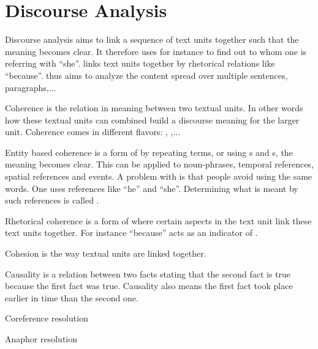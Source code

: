 \section{Discourse Analysis}
\begin{df}{Discourse analysis}
\sb{} aims to link a sequence of text units together such that the meaning becomes clear. It therefore uses for instance  to find out to whom one is referring with ``she''.  links text units together by rhetorical relations like ``because''. \sb{} thus aims to analyze the content spread over multiple sentences, paragraphs,...
\end{df}
\begin{df}{Coherence}
\sb{} is the relation in meaning between two textual units. In other words how these textual units can combined build a discourse meaning for the larger unit. Coherence comes in different flavors: , ,...
\end{df}
\begin{df}{Entity based coherence}
\sb{} is a form of  by repeating terms, or using s and s, the meaning becomes clear. This can be applied to noun-phrases, temporal references, spatial references and events. A problem with \sb{} is that people avoid using the same words. One uses references like ``he'' and ``she''. Determining what is meant by such references is called .
\end{df}
\begin{df}{Rhetorical coherence}
\sb{} is a form of  where certain aspects in the text unit link these text units together. For instance ``because'' acts as an indicator of .
\end{df}
\begin{df}{Cohesion}
\sb{} is the way textual units are linked together.
\end{df}
\begin{df}{Causality}
\sb{} is a relation between two facts stating that the second fact is true because the first fact was true. Causality also means the first fact took place earlier in time than the second one.
\end{df}
\begin{df}{Coreference resolution}

\end{df}
\begin{df}{Anaphor resolution}

\end{df}
